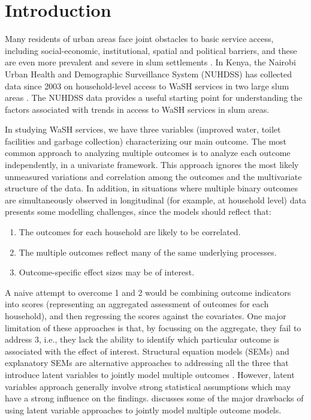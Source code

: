 \section{Introduction}

Many residents of urban areas face joint obstacles to basic service access, including social-economic, institutional, spatial and political barriers, and these are even more prevalent and severe in slum settlements \citep{pierce2017basic}. In Kenya, the Nairobi Urban Health and Demographic Surveillance System (NUHDSS) has collected data since 2003 on household-level access to WaSH services in two large slum areas \citep{beguy2015health}. The NUHDSS data provides a useful starting point for understanding the factors associated with trends in access to WaSH services in slum areas.

In studying WaSH services, we have three variables (improved water, toilet facilities and garbage collection) characterizing our main outcome.  The most common approach to analyzing multiple outcomes is to analyze each outcome independently, in a univariate framework. This approach ignores the most likely unmeasured variations and correlation among the outcomes and the multivariate structure of the data. In addition, in situations where multiple binary outcomes are simultaneously observed in longitudinal (for example, at household level) data presents some modelling challenges, since the models should reflect that:
\begin{enumerate}
\item The outcomes for each household are likely to be correlated.
\item The multiple outcomes reflect many of the same underlying processes.
\item Outcome-specific effect sizes may be of interest.
\end{enumerate}
A naive attempt to overcome 1 and 2 would be combining outcome indicators into scores (representing an aggregated assessment of outcomes for each household), and then regressing the scores against the covariates. One major limitation of these approaches is that, by focussing on the aggregate, they fail to address 3, i.e., they lack the ability to identify which particular outcome is associated with the effect of interest. Structural equation models (SEMs) and explanatory SEMs are alternative approaches to addressing all the three that introduce latent variables to jointly model multiple outcomes \citep{dassimultaneous, fang2018joint, ivanova2016mixed, miro2004bayesian,lalonde2019disc}. However, latent variables approach generally involve strong statistical assumptions which may have a strong influence on the findings. \citet{lalonde2019disc} discusses some of the major drawbacks of using latent variable approaches to jointly model multiple outcome models.

